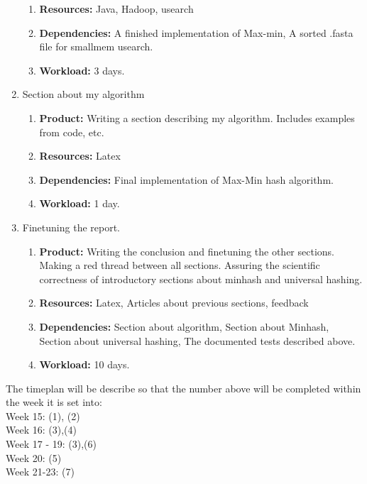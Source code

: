 \documentclass[../../main.tex]{subfiles}
\begin{document}
\begin{enumerate}
\begin{enumerate}
\item {\bf Resources:} Java, Hadoop, usearch
\item {\bf Dependencies:} A finished implementation of Max-min, A sorted .fasta file for smallmem usearch.
\item {\bf Workload:} 3 days.
\end{enumerate}
\item Section about my algorithm
\begin{enumerate}
\item {\bf Product:} Writing a section describing my algorithm. Includes examples from code, etc.
\item {\bf Resources:} Latex
\item {\bf Dependencies:} Final implementation of Max-Min hash algorithm.
\item {\bf Workload:} 1 day.
\end{enumerate}
\item Finetuning the report.
\begin{enumerate}
\item {\bf Product:} Writing the conclusion and finetuning the other sections. Making a red thread between all sections. Assuring the scientific correctness of introductory sections about minhash and universal hashing.
\item {\bf Resources:} Latex, Articles about previous sections, feedback
\item {\bf Dependencies:}  Section about algorithm, Section about Minhash, Section about universal hashing, The documented tests described above. 
\item {\bf Workload:} 10 days.
\end{enumerate}
\end{enumerate}

The timeplan will be describe so that the number above will be completed within the week it is set into:\\

\noindent Week 15: (1), (2)\\
Week 16: (3),(4)\\
Week 17 - 19: (3),(6)\\
Week 20: (5)\\
Week 21-23: (7)


 
 
\end{document}
